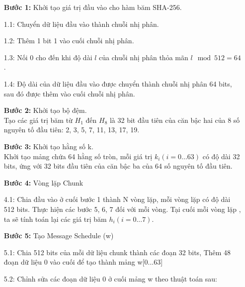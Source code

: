 \begin{itemize}
    \item[\textbf{Bước 1: }] Khởi tạo giá trị đầu vào cho hàm băm SHA-256.
        \item[1.1:] Chuyển dữ liệu đầu vào thành chuỗi nhị phân.
        \item[1.2:] Thêm 1 bit 1 vào cuối chuỗi nhị phân.
        \item[1.3:] Nối 0 cho đến khi độ dài $l$ của chuỗi nhị phân thỏa mãn $ l \mod 512 = 64$.
        \item[1.4:] Độ dài của dữ liệu đầu vào được chuyển thành chuỗi nhị phân 64 bits, 
        sau đó được thêm vào cuối chuỗi nhị phân. 
    \item[\textbf{Bước 2:}] Khởi tạo bộ đệm. \\
        Tạo các giá trị băm từ $H_1$ đến $H_8$ là 32 bit đầu tiên của
        căn bậc hai của 8 số nguyên tố đầu tiên: 2, 3, 5, 7, 11, 13, 17, 19.
    \item[\textbf{Bước 3:}] Khởi tạo hằng số k. \\
        Khởi tạo mảng chứa 64 hằng số tròn, mỗi giá trị $k_i (i = 0...63)$
        có độ dài 32 bits, ứng với 32 bits đầu tiên của căn bậc ba của 64 số nguyên tố 
        đầu tiên.
    \item[\textbf{Bước 4:}] Vòng lặp Chunk
        \item[4.1:] Chia đầu vào ở cuối bước 1 thành N vòng lặp, mỗi vòng lặp có độ
        dài 512 bits.
        Thực hiện các bước 5, 6, 7 đối với mỗi vòng. Tại cuối mỗi vòng
        lặp , ta sẽ tính toán lại các giá trị băm $h_i (i = 0...7)$. 
    \item[\textbf{Bước 5:}] Tạo Message Schedule (w)
        \item[5.1:] Chia 512 bits của mỗi dữ liệu chunk thành các đoạn 32 bits,
        Thêm 48 đoạn dữ liệu 0 vào cuối để tạo thành mảng w[0...63]
        \item[5.2:] Chỉnh sửa các đoạn dữ liệu 0 ở cuối mảng w theo thuật toán sau:


\end{itemize}
